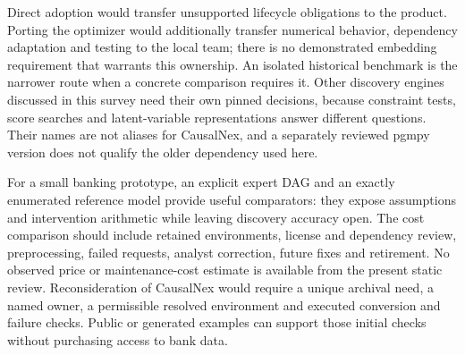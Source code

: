 Direct adoption would transfer unsupported lifecycle obligations to the
product. Porting the optimizer would additionally transfer numerical behavior,
dependency adaptation and testing to the local team; there is no demonstrated
embedding requirement that warrants this ownership. An isolated historical
benchmark is the narrower route when a concrete comparison requires it.
Other discovery engines discussed in this survey need their own pinned
decisions, because constraint tests, score searches and latent-variable
representations answer different questions. Their names are not aliases for
CausalNex, and a separately reviewed pgmpy version does not qualify the older
dependency used here.

For a small banking prototype, an explicit expert DAG and an exactly
enumerated reference model provide useful comparators: they expose assumptions
and intervention arithmetic while leaving discovery accuracy open. The cost
comparison should include retained environments, license and dependency
review, preprocessing, failed requests, analyst correction, future fixes and
retirement. No observed price or maintenance-cost estimate is available from
the present static review. Reconsideration of CausalNex would require a unique
archival need, a named owner, a permissible resolved environment and executed
conversion and failure checks. Public or generated examples can support
those initial checks without purchasing access to bank data.
\label{exec14:causalnex-end}
